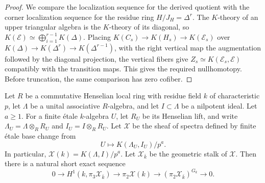 \begin{proof}
We compare the localization sequence for the derived quotient with the corner localization sequence for the residue ring $H/J_H=\Delta^r$.
The $K$-theory of an upper triangular algebra is the $K$-theory of its diagonal, so $K(\mathcal E)\simeq\bigoplus_{i=1}^{r-1}K(\Delta)$.
Placing $K(C_s)\to K(H_s)\to K(\mathcal E_s)$ over $K(\Delta)\to K(\Delta^r)\to K(\Delta^{r-1})$, with the right vertical map the augmentation followed by the diagonal projection, the vertical fibers give $Z_s\simeq K(\mathcal E_s,\mathcal E)$ compatibly with the transition maps.
This gives the required nullhomotopy.
Before truncation, the same comparison has zero cofiber.
\end{proof}

\begin{lemma}
\label{lem:app-nilpotent-etale-descent}
Let $R$ be a commutative Henselian local ring with residue field $k$ of characteristic $p$, let $\Lambda$ be a unital associative $R$-algebra, and let $I\subset\Lambda$ be a nilpotent ideal.
Let $a\ge1$.
For a finite \'etale $k$-algebra $U$, let $R_U$ be its Henselian lift, and write $\Lambda_U=\Lambda\otimes_RR_U$ and $I_U=I\otimes_RR_U$.
Let $\mathcal X$ be the sheaf of spectra defined by finite \'etale base change from
\[
 U\longmapsto K(\Lambda_U,I_U)/p^a.
\]
In particular, $\mathcal X(k)=K(\Lambda,I)/p^a$.
Let $\mathcal X_{\bar k}$ be the geometric stalk of $\mathcal X$.
Then there is a natural short exact sequence
\[
 0\longrightarrow H^1(k,\pi_3\mathcal X_{\bar k})
 \longrightarrow\pi_2\mathcal X(k)
 \longrightarrow(\pi_2\mathcal X_{\bar k})^{G_k}
 \longrightarrow0.
\]
\end{lemma}
